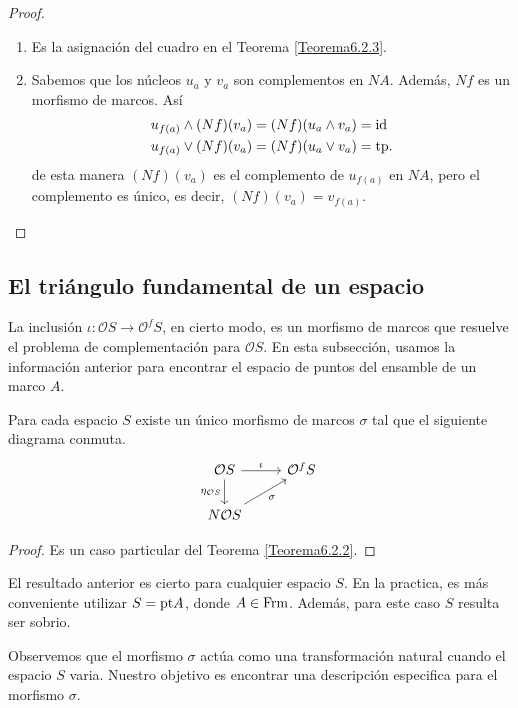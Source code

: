 \begin{proof}
    \begin{enumerate}
        \item Es la asignación del cuadro en el Teorema \ref{Teorema6.2.3}.
        \item Sabemos que los núcleos $u_a$ y $v_a$ son complementos en $NA$. Además, $Nf$ es un morfismo de marcos. Así 
        \[
        \begin{split}
        u_{f(a)}\wedge (Nf)(v_a)&=(Nf)(u_a\wedge v_a)=\mathrm{id}\\  u_{f(a)}\vee (Nf)(v_a)&=(Nf)(u_a\vee v_a)=\mathrm{tp}.
        \end{split}
        \]
        de esta manera $(Nf)(v_a)$ es el complemento de $u_{f(a)}$ en $NA$, pero el complemento es único, es decir, $(Nf)(v_a)=v_{f(a)}$.
    \end{enumerate}
\end{proof}

\subsection{El triángulo fundamental de un espacio}

La inclusión $\iota\colon \mathcal{O}S\to \mathcal{O}^fS$, en cierto modo, es un morfismo de marcos que resuelve el problema de complementación para $\mathcal{O}S$. En esta subsección, usamos la información anterior para encontrar el espacio de puntos del ensamble de un marco $A$.

\begin{lem}\label{Lema6.3.1}
    Para cada espacio $S$ existe un único morfismo de marcos $\sigma$ tal que el siguiente diagrama conmuta.
\[\begin{tikzcd}
	{\mathcal{O}S} & {\mathcal{O} ^fS} \\
	{N\mathcal{O}S}
	\arrow["\iota", from=1-1, to=1-2]
	\arrow["{\eta_{\mathcal{O}S}}"', from=1-1, to=2-1]
	\arrow["\sigma"', from=2-1, to=1-2]
\end{tikzcd}\]
\end{lem}

\begin{proof}
    Es un caso particular del Teorema \ref{Teorema6.2.2}.
\end{proof}

El resultado anterior es cierto para cualquier espacio $S$. En la practica, es más conveniente utilizar $S=\mathrm{pt} A$, donde $A\in \mathrm{Frm}$. Además, para este caso $S$ resulta ser sobrio.

Observemos que el morfismo $\sigma$ actúa como una transformación natural cuando el espacio $S$ varia. Nuestro objetivo es encontrar una descripción especifica para el morfismo $\sigma$.

